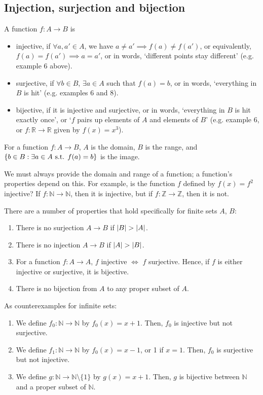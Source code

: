 \subsection{Injection, surjection and bijection}
\begin{definition}
	A function \(f\colon A \to B\) is
	\begin{itemize}
		\item injective, if \(\forall a, a' \in A\), we have \(a \neq a' \implies f(a) \neq f(a')\), or equivalently, \(f(a) = f(a') \implies a = a'\), or in words, `different points stay different' (e.g.
		      example 6 above).
		\item surjective, if \(\forall b \in B\), \(\exists a \in A\) such that \(f(a) = b\), or in words, `everything in \(B\) is hit' (e.g.
		      examples 6 and 8).
		\item bijective, if it is injective and surjective, or in words, `everything in \(B\) is hit exactly once', or `\(f\) pairs up elements of \(A\) and elements of \(B\)' (e.g.
		      example 6, or \(f\colon \mathbb R \to \mathbb R\) given by \(f(x) = x^3\)).
	\end{itemize}
\end{definition}
\begin{definition}
	For a function \(f\colon A \to B\), \(A\) is the domain, \(B\) is the range, and \(\{ b \in B : \exists a \in A \text{ s.t. } f(a) = b \}\) is the image.
\end{definition}
We must always provide the domain and range of a function; a function's properties depend on this.
For example, is the function \(f\) defined by \(f(x) = f^2\) injective?
If \(f\colon \mathbb N \to \mathbb N\), then it is injective, but if \(f\colon \mathbb Z \to \mathbb Z\), then it is not.

There are a number of properties that hold specifically for finite sets \(A\), \(B\):
\begin{enumerate}
	\item There is no surjection \(A \to B\) if \(\abs{B} > \abs{A}\).
	\item There is no injection \(A \to B\) if \(\abs{A} > \abs{B}\).
	\item For a function \(f\colon A \to A\), \(f\) injective \(\iff\) \(f\) surjective.
	      Hence, if \(f\) is either injective or surjective, it is bijective.
	\item There is no bijection from \(A\) to any proper subset of \(A\).
\end{enumerate}
As counterexamples for infinite sets:
\begin{enumerate}
	\item We define \(f_0\colon \mathbb N \to \mathbb N\) by \(f_0(x) = x+1\).
	      Then, \(f_0\) is injective but not surjective.
	\item We define \(f_1\colon \mathbb N \to \mathbb N\) by \(f_0(x) = x-1\), or 1 if \(x=1\).
	      Then, \(f_0\) is surjective but not injective.
	\item We define \(g\colon \mathbb N \to \mathbb N \setminus \{ 1 \}\) by \(g(x) = x+1\).
	      Then, \(g\) is bijective between \(\mathbb N\) and a proper subset of \(\mathbb N\).
\end{enumerate}

